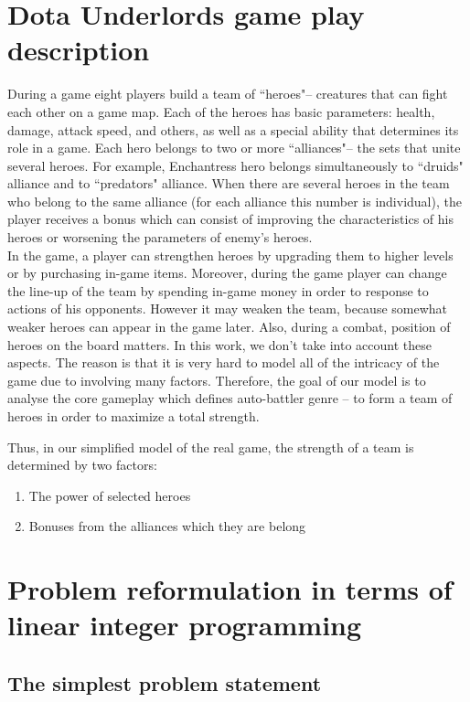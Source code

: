 \documentclass[smallextended]{svjour3}       %
\begin{document}
\section{Dota Underlords game play description}
\label{SectionDUDescription}
During a game eight players build a team of ``heroes"-- creatures that can fight each other on a game map.
Each of the heroes has basic parameters: health, damage, attack speed, and others, as well as a special ability that determines its role in a game.
Each hero belongs to two or more ``alliances"-- the sets that unite several heroes.
For example, Enchantress hero belongs simultaneously to ``druids" alliance and to ``predators" alliance.
When there are several heroes in the team who belong to the same alliance (for each alliance this number is individual), the player receives a bonus which can consist of improving the characteristics of his heroes or worsening the parameters of enemy's heroes.\\
In the game, a player can strengthen heroes by upgrading them to higher levels or by purchasing in-game items.
Moreover, during the game player can change the line-up of the team by spending in-game money in order to response to actions of his opponents.
However it may weaken the team, because somewhat weaker heroes can appear in the game later.
Also, during a combat, position of heroes on the board matters.
In this work, we don't take into account these aspects.
The reason is that it is very hard to model all of the intricacy of the game due to involving many factors.
Therefore, the goal of our model is to analyse the core gameplay which defines auto-battler genre -- to form a team of heroes in order to maximize a total strength.

Thus, in our simplified model of the real game, the strength of a team is determined by two factors:
\begin{enumerate}
    \item The power of selected heroes
    \item Bonuses from the alliances which they are belong
\end{enumerate}


\section{Problem reformulation in terms of linear integer programming}
\label{SectionDUIP}

\subsection{The simplest problem statement}
\end{document}
